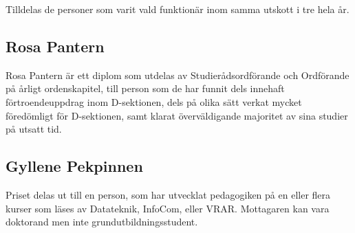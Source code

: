 \documentclass[pdfbookmarks,a4paper,11pt]{article}
\begin{document}
    Tilldelas de personer som varit vald funktionär inom samma utskott i tre hela år.  

\subsection{Rosa Pantern}
Rosa Pantern är ett diplom som utdelas av Studierådsordförande och Ordförande på årligt ordenskapitel, till person som de har funnit dels innehaft förtroendeuppdrag inom D-sektionen, dels på olika sätt verkat mycket föredömligt för D-sektionen, samt klarat överväldigande majoritet av sina studier på utsatt tid.

\subsection{Gyllene Pekpinnen}
Priset delas ut till en person, som har utvecklat pedagogiken på en eller flera kurser som läses av Datateknik, InfoCom, eller VRAR. Mottagaren kan vara doktorand men inte grundutbildningsstudent.
\end{document}
